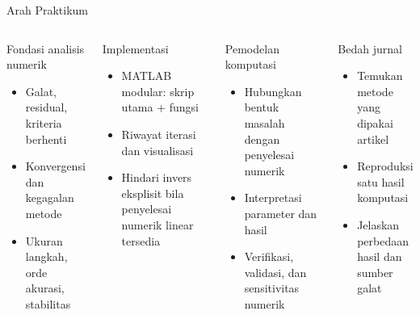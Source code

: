 \documentclass[slides,english,noindex,lean,nobackpage,nocopyright,noupdate,nosummary]{enacom}
\begin{document}
\begin{frame}{Arah Praktikum}
\begin{columns}[T]
\begin{block}{Fondasi analisis numerik}
\begin{itemize}
\item Galat, residual, kriteria berhenti
\item Konvergensi dan kegagalan metode
\item Ukuran langkah, orde akurasi, stabilitas
\end{itemize}
\end{block}
\begin{block}{Implementasi}
\begin{itemize}
\item MATLAB modular: skrip utama + fungsi
\item Riwayat iterasi dan visualisasi
\item Hindari invers eksplisit bila penyelesai numerik linear tersedia
\end{itemize}
\end{block}
\begin{block}{Pemodelan komputasi}
\begin{itemize}
\item Hubungkan bentuk masalah dengan penyelesai numerik
\item Interpretasi parameter dan hasil
\item Verifikasi, validasi, dan sensitivitas numerik
\end{itemize}
\end{block}
\begin{block}{Bedah jurnal}
\begin{itemize}
\item Temukan metode yang dipakai artikel
\item Reproduksi satu hasil komputasi
\item Jelaskan perbedaan hasil dan sumber galat
\end{itemize}
\end{block}
\end{columns}
\end{frame}
\end{document}

